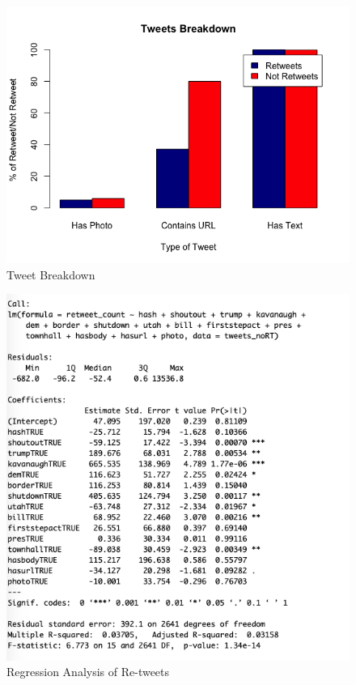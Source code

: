 \documentclass{article}
\begin{document}
\begin{figure}[h!]
\includegraphics[width =\textwidth]{image/TweetBreakdown.png}
\caption{Tweet Breakdown}
\end{figure}
\begin{figure}[h!]
\includegraphics[width =\textwidth]{image/regression_retweet.png}
\caption{Regression Analysis of Re-tweets}
\end{figure}
\end{document}
